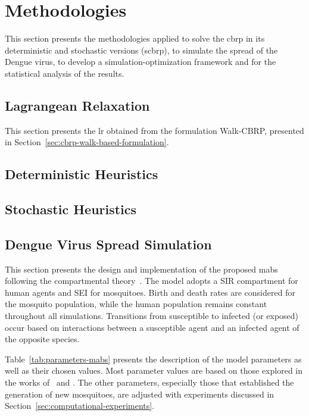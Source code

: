 \chapter{Methodologies}\label{chap:methodologies}

This section presents the methodologies applied to solve the \gls{cbrp} in its deterministic and stochastic versions (\gls{scbrp}),
to simulate the spread of the Dengue virus, to develop a simulation-optimization framework
and for the statistical analysis of the results.

\section{Lagrangean Relaxation}\label{sec:lagrangean-relaxation}

This section presents the \gls{lr} obtained from the formulation Walk-CBRP, presented in
Section~\ref{sec:cbrp-walk-based-formulation}.




\section{Deterministic Heuristics}\label{sec:deterministic-heuristics}

\section{Stochastic Heuristics}\label{sec:stochastic-heuristics}
\section{Dengue Virus Spread Simulation}\label{sec:dengue-virus-spread-simulation}

This section presents the design and implementation of the proposed \gls{mabs}
following the compartmental theory~\citep{amaku:2014}. The model adopts a SIR
compartment for human agents and SEI for mosquitoes. Birth and death rates are
considered for the mosquito population, while the human population remains
constant throughout all simulations. Transitions from susceptible to infected
(or exposed) occur based on interactions between a susceptible agent and an
infected agent of the opposite species.

Table~\ref{tab:parameters-mabs} presents the description of the model parameters
as well as their chosen values. Most parameter values are based on those
explored in the works of~\cite{da-silva:2020} and \cite{dwivedi:2022}. The other
parameters, especially those that established the generation of new mosquitoes,
are adjusted with experiments discussed in
Section~\ref{sec:computational-experiments}.

